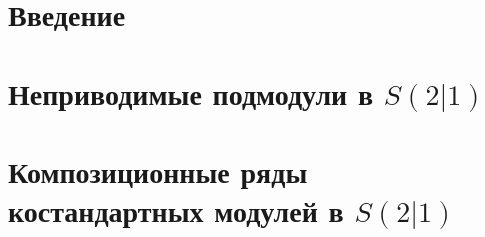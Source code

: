 \section*{Введение}
	

%	
%	

\section{Неприводимые подмодули в $S(2|1)$}
	\cite{base_article}
	
	
\section{Композиционные ряды костандартных модулей в $S(2|1)$}
	